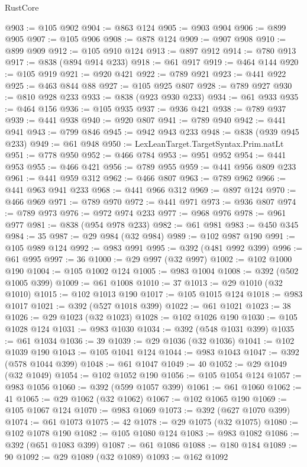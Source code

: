 \begin{lexlean}{RustCore}
\begin{coremodule}
{\begin{coremodule}
{{{{{{{{{{{{{{{{{{{{{{{{{{{{{{{{{{{{{{{{{{{{{{{@903 := @105 @902
@904 := @863 @124
@905 := @903 @904
@906 := @899 @905
@907 := @105 @906
@908 := @878 @124
@909 := @907 @908
@910 := @899 @909
@912 := @105 @910 @124
@913 := @897 @912
@914 := @780 @913
@917 := @838 (@894 @914 @233)
@918 := @61 @917
@919 := @464 @144
@920 := @105 @919
@921 := @920 @421
@922 := @789 @921
@923 := @441 @922
@925 := @463 @844 @88
@927 := @105 @925 @807
@928 := @789 @927
@930 := @810 @928 @233
@933 := @838 (@923 @930 @233)
@934 := @61 @933
@935 := @464 @156
@936 := @105 @935
@937 := @936 @421
@938 := @789 @937
@939 := @441 @938
@940 := @920 @807
@941 := @789 @940
@942 := @441 @941
@943 := @799 @846
@945 := @942 @943 @233
@948 := @838 (@939 @945 @233)
@949 := @61 @948
@950 := LexLeanTarget.TargetSyntax.Prim.natLt
@951 := @778 @950
@952 := @466 @784
@953 := @951 @952
@954 := @441 @953
@955 := @466 @421
@956 := @789 @955
@959 := @441 @956 @809 @233
@961 := @441 @959 @312
@962 := @466 @807
@963 := @789 @962
@966 := @441 @963 @941 @233
@968 := @441 @966 @312
@969 := @897 @124
@970 := @466 @969
@971 := @789 @970
@972 := @441 @971
@973 := @936 @807
@974 := @789 @973
@976 := @972 @974 @233
@977 := @968 @976
@978 := @961 @977
@981 := @838 (@954 @978 @233)
@982 := @61 @981
@983 := @450 @345
@984 := 35
@987 := @29 @984 (@32 @984)
@989 := @102 @987 @190
@991 := @105 @989 @124
@992 := @983 @991
@995 := @392 (@481 @992 @399)
@996 := @61 @995
@997 := 36
@1000 := @29 @997 (@32 @997)
@1002 := @102 @1000 @190
@1004 := @105 @1002 @124
@1005 := @983 @1004
@1008 := @392 (@502 @1005 @399)
@1009 := @61 @1008
@1010 := 37
@1013 := @29 @1010 (@32 @1010)
@1015 := @102 @1013 @190
@1017 := @105 @1015 @124
@1018 := @983 @1017
@1021 := @392 (@527 @1018 @399)
@1022 := @61 @1021
@1023 := 38
@1026 := @29 @1023 (@32 @1023)
@1028 := @102 @1026 @190
@1030 := @105 @1028 @124
@1031 := @983 @1030
@1034 := @392 (@548 @1031 @399)
@1035 := @61 @1034
@1036 := 39
@1039 := @29 @1036 (@32 @1036)
@1041 := @102 @1039 @190
@1043 := @105 @1041 @124
@1044 := @983 @1043
@1047 := @392 (@578 @1044 @399)
@1048 := @61 @1047
@1049 := 40
@1052 := @29 @1049 (@32 @1049)
@1054 := @102 @1052 @190
@1056 := @105 @1054 @124
@1057 := @983 @1056
@1060 := @392 (@599 @1057 @399)
@1061 := @61 @1060
@1062 := 41
@1065 := @29 @1062 (@32 @1062)
@1067 := @102 @1065 @190
@1069 := @105 @1067 @124
@1070 := @983 @1069
@1073 := @392 (@627 @1070 @399)
@1074 := @61 @1073
@1075 := 42
@1078 := @29 @1075 (@32 @1075)
@1080 := @102 @1078 @190
@1082 := @105 @1080 @124
@1083 := @983 @1082
@1086 := @392 (@651 @1083 @399)
@1087 := @61 @1086
@1088 := @180 @184
@1089 := 90
@1092 := @29 @1089 (@32 @1089)
@1093 := @162 @1092
}}}}}}}}}}}}}}}}}}}}}}}}}}}}}}}}}}}}}}}}}}}}}}}
\end{coremodule}}
\end{coremodule}
\end{lexlean}

